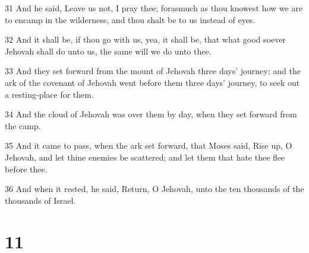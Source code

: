\par 31 And he said, Leave us not, I pray thee; forasmuch as thou knowest how we are to encamp in the wilderness, and thou shalt be to us instead of eyes.
\par 32 And it shall be, if thou go with us, yea, it shall be, that what good soever Jehovah shall do unto us, the same will we do unto thee.
\par 33 And they set forward from the mount of Jehovah three days' journey; and the ark of the covenant of Jehovah went before them three days' journey, to seek out a resting-place for them.
\par 34 And the cloud of Jehovah was over them by day, when they set forward from the camp.
\par 35 And it came to pass, when the ark set forward, that Moses said, Rise up, O Jehovah, and let thine enemies be scattered; and let them that hate thee flee before thee.
\par 36 And when it rested, he said, Return, O Jehovah, unto the ten thousands of the thousands of Israel.

\chapter{11}

